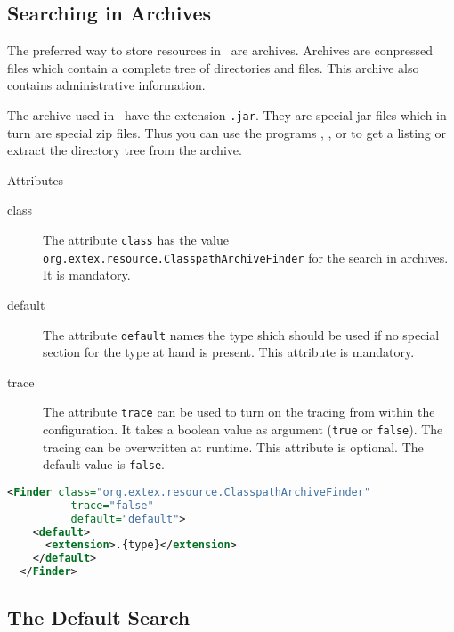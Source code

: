 \begin{lstlisting}[language=XML]
\end{lstlisting}

\INCOMPLETE

\subsection{Searching in Archives}

The preferred way to store resources in \ExTeX\ are archives. Archives
are conpressed files which contain a complete tree of directories and
files. This archive also contains administrative information.

The archive used in \ExTeX\ have the extension \texttt{.jar}. They are
special jar files which in turn are special zip files. Thus you can
use the programs , , or  to get a
listing or extract the directory tree from the archive.

Attributes
\begin{description}
\item[class] The attribute \texttt{class} has the value
  \texttt{org.extex.resource.ClasspathArchiveFinder} for the search in
  archives. It is mandatory.
\item[default] The attribute \texttt{default} names the type shich
  should be used if no special section for the type at hand is
  present. This attribute is mandatory.
\item[trace] The attribute \texttt{trace} can be used to turn on the
  tracing from within the configuration. It takes a boolean value as
  argument (\texttt{true} or \texttt{false}). The tracing can be
  overwritten at runtime. This attribute is optional. The default
  value is \texttt{false}.
\end{description}

\begin{lstlisting}[language=XML]
  <Finder class="org.extex.resource.ClasspathArchiveFinder"
          trace="false"
          default="default">
    <default>
      <extension>.{type}</extension>
    </default>
  </Finder>
\end{lstlisting}

\INCOMPLETE

\subsection{The Default Search}

\INCOMPLETE

